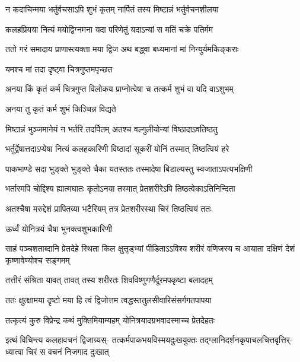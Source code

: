 \twolineshloka
{न कदाचिन्मया भर्तुर्वचसाऽपि शुभं कृतम्}
{नार्पितं तस्य मिष्टान्नं भर्तुर्वचनशीलया} %

\twolineshloka
{कलहप्रियया नित्यं मयोद्विग्नमना यदा}
{परिणेतुं यदाऽन्यां स मतिं चक्रे पतिर्मम} %

\twolineshloka
{ततो गरं समादाय प्राणास्त्यक्ता मया द्विज}
{अथ बद्ध्वा बध्यमानां मां निन्युर्यमकिङ्कराः} %


\onelineshloka
{यमश्च मां तदा दृष्ट्वा चित्रगुप्तमपृच्छत} %


\twolineshloka
{अनया किं कृतं कर्म चित्रगुप्त विलोकय}
{प्राप्नोत्वेषा च तत्कर्म शुभं वा यदि वाऽशुभम्} %





\onelineshloka
{अनया तु कृतं कर्म शुभं किञ्चिन्न विद्यते} %

\twolineshloka
{मिष्टान्नं भुञ्जमानेयं न भर्तरि तदर्पितम्}
{अतश्च वल्गुलीयोन्यां विष्ठादाऽवतिष्ठतु} %

\twolineshloka
{भर्तुर्द्वेषात्तदाऽप्येषा नित्यं कलहकारिणी}
{विष्ठादां सूकरीं योनिं तस्मात् तिष्ठत्वियं हरे} %

\twolineshloka
{पाकभाण्डे सदा भुङ्क्ते भुङ्क्ते चैका यतस्ततः}
{तस्मादेषा बिडाल्यस्तु स्वजाताऽपत्यभक्षिणी} %

\twolineshloka
{भर्तारमपि चोद्दिश्य ह्यात्मघातः कृतोऽनया}
{तस्मात् प्रेतशरीरेऽपि तिष्ठत्वेकाऽतिनिन्दिता} %

\twolineshloka
{अतश्चैषा मरुद्देशं प्रापितव्या भटैरियम्}
{तत्र प्रेतशरीरस्था चिरं तिष्ठत्वियं ततः} %


\onelineshloka
{ऊर्ध्वं योनित्रयं चैषा भुनक्त्वशुभकारिणी} %


\threelineshloka
{साहं पञ्चशताब्दानि प्रेतदेहे स्थिता किल}
{क्षुत्तृड्भ्यां पीडिताऽऽविश्य शरीरं वणिजस्य च}
{आयाता दक्षिणं देशं कृष्णावेण्योश्च सङ्गमम्} %

\twolineshloka
{तत्तीरं संश्रिता यावत् तावत् तस्य शरीरतः}
{शिवविष्णुगणैर्दूरमपकृष्टा बलादहम्} %

\twolineshloka
{ततः क्षुत्क्षामया दृष्टो मया हि त्वं द्विजोत्तम}
{त्वद्धस्ततुलसीवारिसंसर्गगतपापया} %

\twolineshloka
{तत्कृत्यं कुरु विप्रेन्द्र कथं मुक्तिमियाम्यहम्}
{योनित्रयादग्रभवादस्माच्च प्रेतदेहतः} %

\fourlineindentedshloka
{इत्थं विचिन्त्य कलहावचनं द्विजाग्र्यस्-}
{तत्कर्मपाकभयविस्मयदुःखयुक्तः}
{तद्ग्लानिदर्शनकृपाचलचित्तवृत्तिर्-}
{ध्यात्वा चिरं स वचनं निजगाद दुःखात्} %


